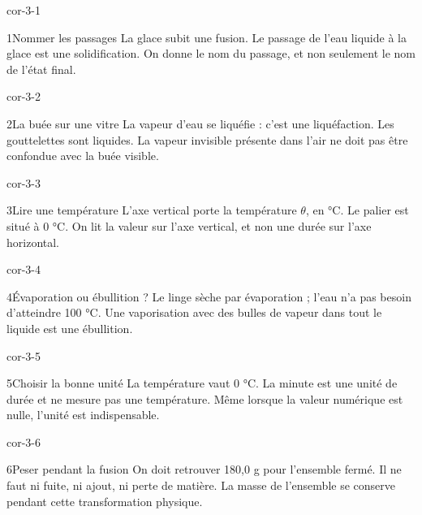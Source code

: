 \documentclass[12pt,twoside,openany]{book}
\begin{document}
\clearpage{}
\begin{blocLivre}{cor-3-1}
\begin{corrige}{1}{Nommer les passages}
La glace subit une fusion. Le passage de l’eau liquide à la glace est une solidification. On donne le nom du passage, et non seulement le nom de l’état final.\par
{}
\end{corrige}\end{blocLivre}
\begin{blocLivre}{cor-3-2}
\begin{corrige}{2}{La buée sur une vitre}
La vapeur d’eau se liquéfie : c’est une liquéfaction. Les gouttelettes sont liquides. La vapeur invisible présente dans l’air ne doit pas être confondue avec la buée visible.\par
\end{corrige}\end{blocLivre}
\begin{blocLivre}{cor-3-3}
\begin{corrige}{3}{Lire une température}
L’axe vertical porte la température \(\theta\), en °C. Le palier est situé à 0 °C. On lit la valeur sur l’axe vertical, et non une durée sur l’axe horizontal.\par
\end{corrige}\end{blocLivre}
\begin{blocLivre}{cor-3-4}
\begin{corrige}{4}{Évaporation ou ébullition ?}
Le linge sèche par évaporation ; l’eau n’a pas besoin d’atteindre 100 °C. Une vaporisation avec des bulles de vapeur dans tout le liquide est une ébullition.\par
\end{corrige}\end{blocLivre}
\begin{blocLivre}{cor-3-5}
\begin{corrige}{5}{Choisir la bonne unité}
La température vaut 0 °C. La minute est une unité de durée et ne mesure pas une température. Même lorsque la valeur numérique est nulle, l’unité est indispensable.\par
\end{corrige}\end{blocLivre}
\begin{blocLivre}{cor-3-6}
\begin{corrige}{6}{Peser pendant la fusion}
On doit retrouver 180,0 g pour l’ensemble fermé. Il ne faut ni fuite, ni ajout, ni perte de matière. La masse de l’ensemble se conserve pendant cette transformation physique.\par
\end{corrige}\end{blocLivre}
\end{document}
